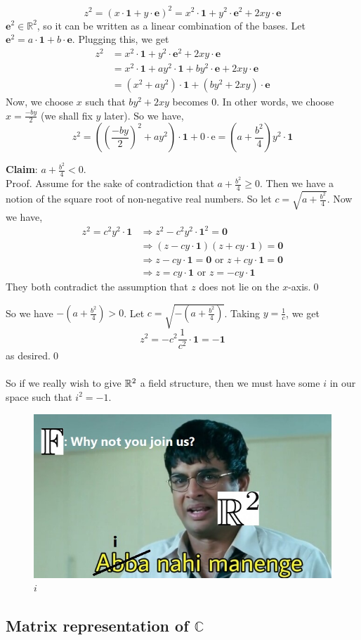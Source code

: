$$
z^2=(x \cdot \mathbf{1}+y \cdot \mathbf{e})^2=x^2 \cdot \mathbf{1}+y^2 \cdot \mathbf{e}^2+2 x y \cdot \mathbf{e}
$$
$\mathbf{e}^2 \in \mathbb{R}^2$, so it can be written as a linear combination of the bases. Let $\mathbf{e}^2=a \cdot \mathbf{1}+b \cdot \mathbf{e}$. Plugging this, we get
$$
\begin{aligned}
z^2 & =x^2 \cdot \mathbf{1}+y^2 \cdot \mathbf{e}^2+2 x y \cdot \mathbf{e} \\
& =x^2 \cdot \mathbf{1}+a y^2 \cdot \mathbf{1}+b y^2 \cdot \mathbf{e}+2 x y \cdot \mathbf{e} \\
& =\left(x^2+a y^2\right) \cdot \mathbf{1}+\left(b y^2+2 x y\right) \cdot \mathbf{e}
\end{aligned}
$$
Now, we choose $x$ such that $b y^2+2 x y$ becomes 0. In other words, we choose $x=\frac{-b y}{2}$ (we shall fix $y$ later). So we have,
$$
z^2=\left(\left(\frac{-b y}{2}\right)^2+a y^2\right) \cdot \mathbf{1}+0 \cdot \mathrm{e}=\left(a+\frac{b^2}{4}\right) y^2 \cdot \mathbf{1}
$$
\begin{tcolorbox}
\textbf{Claim}: $a+\frac{b^2}{4}<0$.\\
Proof. Assume for the sake of contradiction that $\displaystyle a+\frac{b^2}{4} \geq 0$. Then we have a notion of the square root of non-negative real numbers. So let $\displaystyle c=\sqrt{a+\frac{b^2}{4}}$. Now we have,
$$
\begin{aligned}
z^2=c^2 y^2 \cdot \mathbf{1} & \Longrightarrow z^2-c^2 y^2 \cdot \mathbf{1}^2=\mathbf{0} \\
& \Longrightarrow(z-c y \cdot \mathbf{1})(z+c y \cdot \mathbf{1})=\mathbf{0} \\
& \Longrightarrow z-c y \cdot \mathbf{1}=\mathbf{0} \text { or } z+c y \cdot \mathbf{1}=\mathbf{0} \\
& \Longrightarrow z=c y \cdot \mathbf{1} \text { or } z=-c y \cdot \mathbf{1}
\end{aligned}
$$
They both contradict the assumption that $z$ does not lie on the $x$-axis.\qed
\end{tcolorbox}
So we have $\displaystyle -\left(a+\frac{b^2}{4}\right)>0$. Let $c=\sqrt{-\left(a+\frac{b^2}{4}\right)}$. Taking $\displaystyle y=\frac{1}{c}$, we get $$z^2=-c^2\frac{1}{c^2}\cdot\mathbf{1}=-\mathbf{1}$$
as desired.\qed
\\~\\
So if we really wish to give $\Bbb{R}^2$ a field structure, then we must have some $i$ in our space such that $i^2=-1$.
\begin{figure}[ht!]
    \centering
    \includegraphics[width=0.5\linewidth]{MEMES/i.jpg}
    \caption{$i$}
\end{figure}
\subsection{Matrix representation of $\mathbb{C}$}
